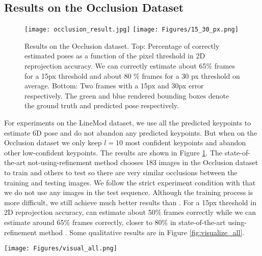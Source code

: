 \documentclass[10pt,twocolumn,letterpaper]{article}
\begin{document}
\subsection{Results on the Occlusion Dataset}
\label{sec:occlusionresult}
\begin{figure}[t]
\begin{center}
   \texttt{[image: occlusion\_result.jpg]}
    \texttt{[image: Figures/15\_30\_px.png]}
\end{center}
   \caption{Results on the Occlusion dataset. Top: Percentage of correctly estimated poses as a function of the pixel threshold in 2D reprojection accuracy. We can correctly estimate about 65\% frames for a 15px threshold and about 80 \% frames for a 30 px threshold on average. Bottom: Two frames with a 15px and 30px error respectively. The green and blue rendered bounding boxes denote the ground truth and predicted pose respectively.}
\label{fig:occlusion_result}
\end{figure}
For experiments on the LineMod dataset, we use all the predicted keypoints to estimate 6D pose and do not abandon any predicted keypoints. But when on the Occlusion dataset we only keep $l=10$ most confident keypoints and abandon other low-confident keypoints. The results are shown in Figure \ref{fig:occlusion_result}. The state-of-the-art not-using-refinement method \cite{tekin18} chooses 183 images in the Occlusion dataset to train and others to test so there are very similar occlusions between the training and testing images. We follow the strict experiment condition with \cite{Rad2017BB8AS} that we do not use any images in the test sequence. Although the training process is more difficult, we still achieve much better results than  \cite{tekin18}. For a 15px threshold in 2D reprojection accuracy, \cite{tekin18} can estimate about 50\% frames correctly while we can estimate around 65\% frames correctly, closer to 80\% in state-of-the-art using-refinement method \cite{Rad2017BB8AS}. Some qualitative results are in Figure \ref{fig:visualize_all}.

\begin{figure*}[t]
\begin{center}
   \texttt{[image: Figures/visual\_all.png]}
\end{center}
   \caption{Qualitative results on LineMod and Occlusion datasets. First two rows: Results on the LineMod dataset, our method can estimate 6D pose correctly in challenging scenes with extreme lighting conditions, heavy clutter and motion blur. Third row: Result on the Occlusion dataset. We can still recover pose correctly when partial occlusion exists. Last row: Failure cases on the Occlusion dataset due to severe blur or overly deficient feature information.}
\label{fig:visualize_all}
\end{figure*}
\end{document}
